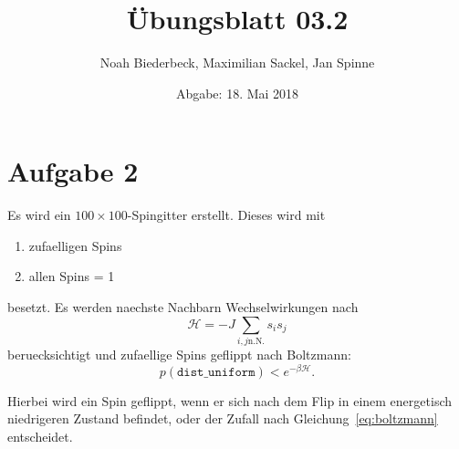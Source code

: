 \documentclass{scrartcl}
\title{Übungsblatt 03.2}
\author{%
  Noah Biederbeck, Maximilian Sackel, Jan Spinne
}
\date{Abgabe: 18. Mai 2018}
\begin{document}
\maketitle

\section*{Aufgabe 2}%
\label{sec:aufgabe_2}
Es wird ein $100 \times 100$-Spingitter erstellt.
Dieses wird mit
\begin{enumerate}
  \item zufaelligen Spins
  \item allen Spins = 1
\end{enumerate}
besetzt.
Es werden naechste Nachbarn Wechselwirkungen nach
\begin{equation}
  \mathcal{H} = -J \sum_{i, j \text{n.N.}} s_i s_j
\end{equation}
beruecksichtigt und zufaellige Spins geflippt nach Boltzmann:
\begin{equation}
  p(\texttt{dist\_uniform}) < e^{-\beta \mathcal{H}}.
  \label{eq:boltzmann}
\end{equation}

Hierbei wird ein Spin geflippt, wenn er sich nach dem Flip in einem energetisch niedrigeren Zustand befindet, oder der Zufall nach Gleichung~\ref{eq:boltzmann} entscheidet.
\end{document}
